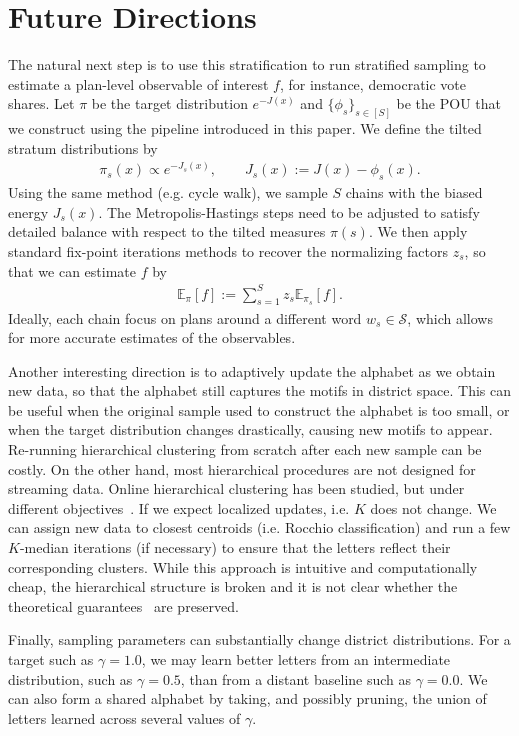 \section{Future Directions}\label{sec:chap4 future_directions}

The natural next step is to use this stratification to run stratified sampling to estimate a plan-level observable of interest $f$, for instance, democratic vote shares.
Let $\pi$ be the target distribution $e^{-J(x)}$ and $\{\phi_s\}_{s\in[S]}$ be the POU that we construct using the pipeline introduced in this paper.
We define the tilted stratum distributions by 
    \begin{align}
        \pi_s(x)\propto e^{-J_s(x)},\quad\quad J_s(x):=J(x)-\phi_s(x).
    \end{align}
Using the same method (e.g. cycle walk), we sample $S$ chains with the biased energy $J_s(x)$.
The Metropolis-Hastings steps need to be adjusted to satisfy detailed balance with respect to the tilted measures $\pi(s)$.
We then apply standard fix-point iterations methods to recover the normalizing factors $z_s$, so that we can estimate $f$ by
    \begin{align}
        \mathbb{E}_\pi[f]:=\sum_{s=1}^Sz_s\mathbb{E}_{\pi_s}[f].
    \end{align}
Ideally, each chain focus on plans around a different word $w_s\in\mathcal{S}$, which allows for more accurate estimates of the observables.

Another interesting direction is to adaptively update the alphabet as we obtain new data, so that the alphabet still captures the motifs in district space.
This can be useful when the original sample used to construct the alphabet is too small, or when the target distribution changes drastically, causing new motifs to appear.
Re-running hierarchical clustering from scratch after each new sample can be costly.
On the other hand, most hierarchical procedures are not designed for streaming data.
Online hierarchical clustering has been studied, but under different objectives~\cite{menon2019online}.
If we expect localized updates, i.e. $K$ does not change.
We can assign new data to closest centroids (i.e. Rocchio classification) and run a few $K$-median iterations (if necessary) to ensure that the letters reflect their corresponding clusters.
While this approach is intuitive and computationally cheap, the hierarchical structure is broken and it is not clear whether the theoretical guarantees~\cite{DBLP:journals/corr/abs-2409-01010} are preserved.

Finally, sampling parameters can substantially change district distributions.
For a target such as $\gamma=1.0$, we may learn better letters from an intermediate distribution, such as $\gamma=0.5$, than from a distant baseline such as $\gamma=0.0$.
We can also form a shared alphabet by taking, and possibly pruning, the union of letters learned across several values of $\gamma$.
